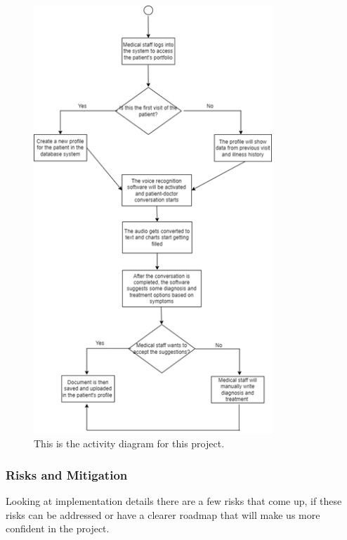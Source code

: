 \documentclass[12pt]{article}
\begin{document}
\begin{figure}[h]
  \centering
  \includegraphics[width=0.8\textwidth]{activity_diag.png}
  \caption{This is the activity diagram for this project.}
  \label{fig:Activity Diagram}
\end{figure}

\subsubsection{Risks and Mitigation}

Looking at implementation details there are a few risks that come up, if these risks can be addressed or have a clearer roadmap that will make us more confident in the project. 
\end{document}
